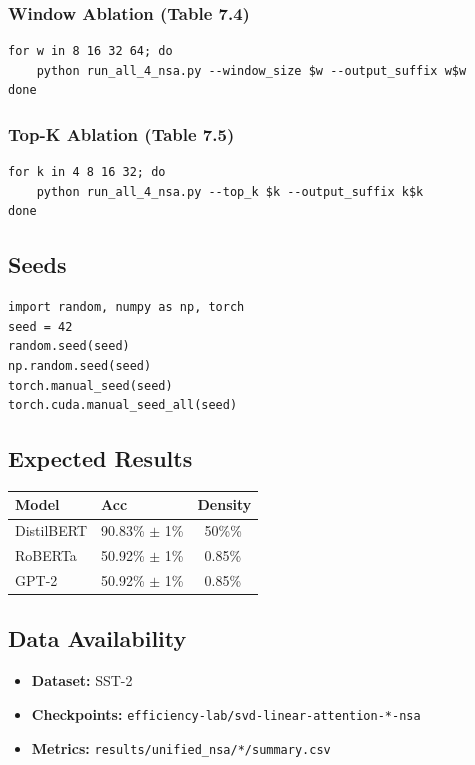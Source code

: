 \subsubsection{Window Ablation (Table 7.4)}
\begin{lstlisting}
for w in 8 16 32 64; do
    python run_all_4_nsa.py --window_size $w --output_suffix w$w
done
\end{lstlisting}

\subsubsection{Top-K Ablation (Table 7.5)}
\begin{lstlisting}
for k in 4 8 16 32; do
    python run_all_4_nsa.py --top_k $k --output_suffix k$k
done
\end{lstlisting}

\subsection{Seeds}

\begin{lstlisting}
import random, numpy as np, torch
seed = 42
random.seed(seed)
np.random.seed(seed)
torch.manual_seed(seed)
torch.cuda.manual_seed_all(seed)
\end{lstlisting}

\subsection{Expected Results}

\begin{table}[H]
\centering
\small
\begin{tabular}{lll}
\toprule
\textbf{Model} & \textbf{Acc} & \textbf{Density} \\
\midrule
DistilBERT & 90.83\% $\pm$ 1\% & ~50\%\% \\
RoBERTa & 50.92\% $\pm$ 1\% & ~0.85\% \\
GPT-2 & 50.92\% $\pm$ 1\% & ~0.85\% \\
\bottomrule
\end{tabular}
\end{table}

\subsection{Data Availability}

\begin{itemize}
\item \textbf{Dataset:} SST-2
\item \textbf{Checkpoints:} \texttt{efficiency-lab/svd-linear-attention-*-nsa}
\item \textbf{Metrics:} \texttt{results/unified\_nsa/*/summary.csv}

\end{itemize}
